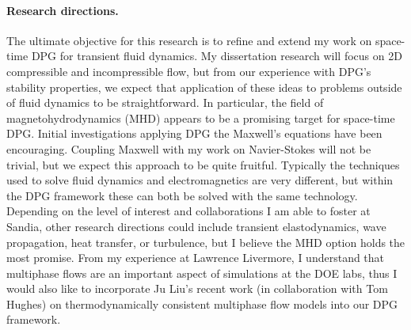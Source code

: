 \documentclass[letterpaper,12pt]{article}
\begin{document}
\paragraph{Research directions.}
The ultimate objective for this research is to refine and extend my work on space-time DPG for transient fluid dynamics.
My dissertation research will focus on 2D compressible and incompressible flow, 
but from our experience with DPG's stability properties, we expect that application of these ideas to problems outside of fluid dynamics to be straightforward.
In particular, the field of magnetohydrodynamics (MHD) appears to be a promising target for space-time DPG.
Initial investigations applying DPG the Maxwell's equations have been encouraging.
Coupling Maxwell with my work on Navier-Stokes will not be trivial, but we expect this approach to be quite fruitful.
Typically the techniques used to solve fluid dynamics and electromagnetics are very different, but within the DPG framework these can both be solved
with the same technology.
Depending on the level of interest and collaborations I am able to foster at Sandia, 
other research directions could include transient elastodynamics, wave propagation, heat transfer, or turbulence,
but I believe the MHD option holds the most promise.
From my experience at Lawrence Livermore, I understand that multiphase flows are an important aspect of 
simulations at the DOE labs, thus
I would also like to incorporate Ju Liu's recent work (in collaboration with Tom Hughes) on thermodynamically consistent multiphase flow models
into our DPG framework.

\end{document}
